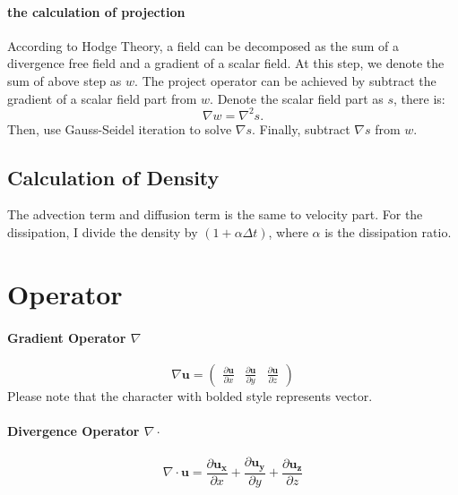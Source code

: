 \documentclass[a4paper, 9pt]{extarticle}
\begin{document}
\paragraph{the calculation of projection}
According to Hodge Theory, a field can be decomposed as the sum of a divergence free field and 
a gradient of a scalar field. At this step, we denote the sum of above step as $w$. The project operator can be achieved by subtract the gradient of a scalar field part from $w$. Denote the scalar field part as $s$, there is:
\begin{equation}
    \nabla w = \nabla^2 s.
\end{equation}
Then, use Gauss-Seidel iteration to solve $\nabla s$. Finally, subtract $\nabla s$ from $w$.

\subsection{Calculation of Density}
The advection term and diffusion term is the same to velocity part. For the dissipation, I divide the density by $(1+\alpha \Delta t)$, where $\alpha$ is the dissipation ratio.


\appendix

\section{Operator}
\paragraph{Gradient Operator $\nabla$}
\begin{equation}
    \nabla \mathbf{u} = \begin{pmatrix} \frac{\partial \mathbf{u}}{\partial x} & \frac{\partial \mathbf{u}}{\partial y} & \frac{\partial \mathbf{u}}{\partial z} \end{pmatrix}
\end{equation}
Please note that the character with bolded style represents vector.

\paragraph{Divergence Operator $\nabla \cdot$}
\begin{equation}
    \nabla \cdot \mathbf{u} = \frac{\partial \mathbf{u_x}}{\partial x} + \frac{\partial \mathbf{u_y}}{\partial y} + \frac{\partial \mathbf{u_z}}{\partial z} 
\end{equation}
\end{document}
